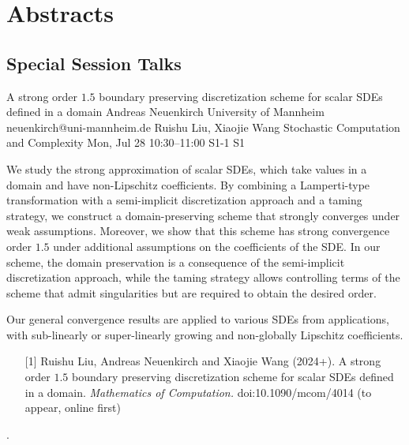 \chapter{Abstracts}\newpage\section{Special Session Talks}

\begin{talk}
  {A strong order $1.5$ boundary preserving discretization scheme for scalar SDEs defined in a domain}%
  {Andreas Neuenkirch}%
  {University of Mannheim}%
  {neuenkirch@uni-mannheim.de}%
  {Ruishu Liu, Xiaojie Wang}%
  {Stochastic Computation and Complexity}%
  {Mon, Jul 28 10:30–11:00}%
  {S1-1}%
  {S1}%
				
			
We study the strong approximation of scalar SDEs, which take values in a domain and have non-Lipschitz coefficients.
By combining a Lamperti-type transformation with a semi-implicit discretization approach and a taming 
strategy,  we construct a domain-preserving scheme that strongly converges under weak assumptions. 
Moreover,
we show that this scheme has strong convergence order $1.5$ under additional assumptions on the coefficients of the SDE. In our scheme, the domain preservation is a consequence of the semi-implicit discretization approach, while the taming strategy allows controlling terms of the scheme that admit singularities but are required to obtain the desired order.

Our general convergence results  are  applied to various SDEs from applications, with sub-linearly or super-linearly growing and non-globally Lipschitz coefficients.


\medskip

\begin{enumerate}
	\item[{[1]}]  Ruishu Liu, Andreas Neuenkirch and Xiaojie Wang (2024+). A strong order $1.5$
	boundary preserving discretization scheme for scalar SDEs defined in a domain. {\it Mathematics of Computation.} doi:10.1090/mcom/4014 (to appear, online first)
\end{enumerate}
.
\end{talk}


